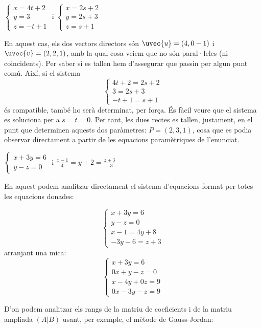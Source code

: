 \begin{llista}
  \item $\begin{cases}x=4t+2\\y=3\\z=-t+1\end{cases}$ i $\begin{cases}x=2s+2\\y=2s+3\\z=s+1\end{cases}$

En aquest cas, els dos vectors directors són $\uvec{u}=(4,0-1)$ i $\uvec{v}=(2,2,1)$, amb la qual cosa veiem que no són paral·leles (ni coincidents). Per saber si es tallen hem d'assegurar que passin per algun punt comú. Així, si el sistema
\[
\begin{cases}4t+2=2s+2\\3=2s+3\\-t+1=s+1\end{cases}
\]
és compatible, també ho serà determinat, per força. És fàcil veure que el sistema es soluciona per a $s=t=0$. Per tant, les dues rectes es tallen, justament, en el punt que determinen aquests dos paràmetres: $P=(2,3,1)$, cosa que es podia observar directament a partir de les equacions paramètriques de l'enunciat.
\blacksquare

  \item $\begin{cases}x+3y=6\\y-z=0\end{cases}$ i $\frac{x-1}{4}=y+2=\frac{z+3}{-3}$

En aquest podem analitzar directament el sistema d'equacions format per totes les equacions donades:

\[
\begin{cases}
  x+3y=6\\
  y-z=0\\
  x-1=4y+8\\
  -3y-6=z+3
\end{cases}
\]
arranjant una mica:
\[
\begin{cases}
  x+3y=6\\
  0x+y-z=0\\
  x-4y+0z=9\\
  0x-3y-z=9
\end{cases}
\]

D'on podem analitzar els rangs de la matriu de coeficients i de la matriu ampliada $(A|B)$ usant, per exemple, el mètode de Gauss-Jordan:


\end{llista}

